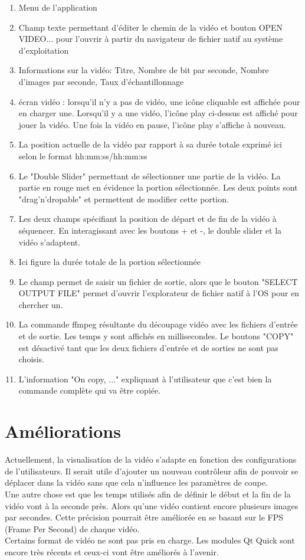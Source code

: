 \documentclass[11pt, a4paper, french]{article}
\begin{document}
	 \begin{enumerate}
	 	\item Menu de l'application
	 	\item Champ texte permettant d'éditer le chemin de la vidéo et bouton OPEN VIDEO... pour l'ouvrir à partir du navigateur de fichier natif au système d'exploitation
	 	\item Informations sur la vidéo: Titre, Nombre de bit par seconde, Nombre d'images par seconde, Taux d'échantillonnage
	 	\item écran vidéo : lorsqu'il n'y a pas de vidéo, une icône cliquable est affichée pour en charger une. Lorsqu'il y a une vidéo, l'icône play ci-dessus est affiché pour jouer la vidéo. Une fois la vidéo en pause, l'icône play s'affiche à nouveau.
	 	\item La position actuelle de la vidéo par rapport à sa durée totale exprimé ici selon le format hh:mm:ss/hh:mm:ss
	 	\item Le "Double Slider" permettant de sélectionner une partie de la vidéo. La partie en rouge met en évidence la portion sélectionnée. Les deux points sont "drag'n'dropable" et permettent de modifier cette portion.
	 	\item Les deux champs spécifiant la position de départ et de fin de la vidéo à séquencer. En interagissant avec les boutons + et -, le double slider et la vidéo s'adaptent.
	 	\item Ici figure la durée totale de la portion sélectionnée
	 	\item Le champ permet de saisir un fichier de sortie, alors que le bouton "SELECT OUTPUT FILE" permet d'ouvrir l'explorateur de fichier natif à l'OS pour en chercher un.
	 	\item La commande ffmpeg résultante du découpage vidéo avec les fichiers d'entrée et de sortie. Les temps y sont affichés en millisecondes. Le boutons "COPY" est désactivé tant que les deux fichiers d'entrée et de sorties ne sont pas choisis.
	 	\item L'information "On copy, ..." expliquant à l'utilisateur que c'est bien la commande complète qui va être copiée.
	 \end{enumerate}

	\part*{Améliorations}
		Actuellement, la visualisation de la vidéo s'adapte en fonction des configurations de l'utilisateurs. Il serait utile d'ajouter un nouveau contrôleur afin de pouvoir se déplacer dans la vidéo sans que cela n'influence les paramètres de coupe. \\
		
		Une autre chose est que les temps utilisés afin de définir le début et la fin de la vidéo vont à la seconde près. Alors qu'une vidéo contient encore plusieurs images par secondes. Cette précision pourrait être améliorée en se basant sur le FPS (Frame Per Second) de chaque vidéo. \\
		
		Certains format de vidéo ne sont pas pris en charge. Les modules Qt Quick sont encore très récents et ceux-ci vont être améliorés à l'avenir.
	
\end{document}
